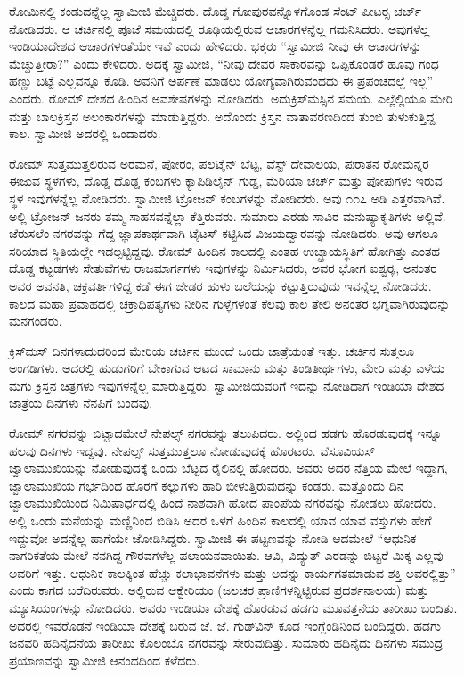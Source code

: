  ರೋಮಿನಲ್ಲಿ ಕಂಡುದನ್ನೆಲ್ಲ ಸ್ವಾಮೀಜಿ ಮೆಚ್ಚಿದರು. ದೊಡ್ಡ ಗೋಪುರವನ್ನೊಳಗೊಂಡ ಸೆಂಟ್ ಪೀಟರ‍್ಸ ಚರ್ಚ್ ನೋಡಿದರು. ಆ ಚರ್ಚಿನಲ್ಲಿ ಪೂಜೆ ಸಮಯದಲ್ಲಿ ರೂಢಿಯಲ್ಲಿರುವ ಆಚಾರಗಳನ್ನೆಲ್ಲ ಗಮನಿಸಿದರು. ಅವುಗಳೆಲ್ಲ ಇಂಡಿಯಾದೇಶದ ಆಚಾರಗಳಂತೆಯೇ ಇವೆ ಎಂದು ಹೇಳಿದರು. ಭಕ್ತರು “ಸ್ವಾಮೀಜಿ ನೀವು ಈ ಆಚಾರಗಳನ್ನು ಮೆಚ್ಚುತ್ತೀರಾ?” ಎಂದು ಕೇಳಿದರು. ಅದಕ್ಕೆ ಸ್ವಾಮೀಜಿ, “ನೀವು ದೇವರ ಸಾಕಾರವನ್ನು ಒಪ್ಪಿಕೊಂಡರೆ ಹೂವು ಗಂಧ ಹಣ್ಣು ಬಟ್ಟೆ ಎಲ್ಲವನ್ನೂ ಕೊಡಿ. ಅವನಿಗೆ ಅರ್ಪಣೆ ಮಾಡಲು ಯೋಗ್ಯವಾಗಿರುವಂಥದು ಈ ಪ್ರಪಂಚದಲ್ಲೆ ಇಲ್ಲ” ಎಂದರು. ರೋಮ್ ದೇಶದ ಹಿಂದಿನ ಅವಶೇಷಗಳನ್ನು ನೋಡಿದರು. ಅದು\break ಕ್ರಿಸ್‍ಮಸ್ಸಿನ ಸಮಯ. ಎಲ್ಲೆಲ್ಲಿಯೂ ಮೇರಿ ಮತ್ತು ಬಾಲಕ್ರಿಸ್ತನ ಅಲಂಕಾರಗಳನ್ನು ಮಾಡುತ್ತಿದ್ದರು. ಅದೊಂದು ಕ್ರಿಸ್ತನ ವಾತಾವರಣದಿಂದ ತುಂಬಿ ತುಳುಕುತ್ತಿದ್ದ ಕಾಲ. ಸ್ವಾಮೀಜಿ ಅದರಲ್ಲಿ ಒಂದಾದರು. 

 ರೋಮ್ ಸುತ್ತಮುತ್ತಲಿರುವ ಅರಮನೆ, ಪೋರಂ, ಪಲಟೈನ್ ಬೆಟ್ಟ, ವೆಸ್ಟ್ ದೇವಾಲಯ, ಪುರಾತನ ರೋಮನ್ನರ ಈಜುವ ಸ್ಥಳಗಳು, ದೊಡ್ಡ ದೊಡ್ಡ ಕಂಬಗಳು ಕ್ಯಾಪಿಡಿಲೈನ್ ಗುಡ್ಡ, ಮೆರಿಯಾ ಚರ್ಚ್ ಮತ್ತು ಪೋಪುಗಳು ಇರುವ ಸ್ಥಳ ಇವುಗಳನ್ನೆಲ್ಲ ನೋಡಿದರು. ಸ್ವಾಮೀಜಿ ಟ್ರೋಜನ್ ಕಂಬಗಳನ್ನು ನೋಡಿದರು. ಅವು ೧೧೭ ಅಡಿ ಎತ್ತರವಾಗಿವೆ. ಅಲ್ಲಿ ಟ್ರೋಜನ್ ಜನರು ತಮ್ಮ ಸಾಹಸವನ್ನೆಲ್ಲಾ ಕೆತ್ತಿರುವರು. ಸುಮಾರು ಎರಡು ಸಾವಿರ ಮನುಷ್ಯಾಕೃತಿಗಳು ಅಲ್ಲಿವೆ. ಜೆರುಸಲೆಂ ನಗರವನ್ನು ಗೆದ್ದ ಜ್ಞಾಪಕಾರ್ಥವಾಗಿ ಟೈಟಸ್ ಕಟ್ಟಿಸಿದ ವಿಜಯದ್ವಾರವನ್ನು ನೋಡಿದರು. ಅವು ಆಗಲೂ ಸರಿಯಾದ ಸ್ಥಿತಿಯಲ್ಲೇ ಇಡಲ್ಪಟ್ಟಿದ್ದವು. ರೋಮ್ ಹಿಂದಿನ ಕಾಲದಲ್ಲಿ ಎಂತಹ ಉಚ್ಛ್ರಾಯಸ್ಥಿತಿಗೆ ಹೋಗಿತ್ತು ಎಂತಹ ದೊಡ್ಡ ಕಟ್ಟಡಗಳು ಸೇತುವೆಗಳು ರಾಜಮಾರ್ಗಗಳು ಇವುಗಳನ್ನು ನಿರ್ಮಿಸಿದರು, ಅವರ ಭೋಗ ಐಶ್ವರ‍್ಯ, ಅನಂತರ ಅವರ ಅವನತಿ, ಚಕ್ರವರ್ತಿಗಳಿದ್ದ ಕಡೆ ಈಗ ಜೇಡರ ಹುಳು ಬಲೆಯನ್ನು ಕಟ್ಟುತ್ತಿರುವುದು ಇವನ್ನೆಲ್ಲ ನೋಡಿದರು. ಕಾಲದ ಮಹಾ ಪ್ರವಾಹದಲ್ಲಿ ಚಕ್ರಾಧಿಪತ್ಯಗಳು ನೀರಿನ ಗುಳ್ಳೆಗಳಂತೆ ಕೆಲವು ಕಾಲ ತೇಲಿ ಅನಂತರ ಭಗ್ನವಾಗಿರುವುದನ್ನು ಮನಗಂಡರು. 

 ಕ್ರಿಸ್‍ಮಸ್ ದಿನಗಳಾದುದರಿಂದ ಮೇರಿಯ ಚರ್ಚಿನ ಮುಂದೆ ಒಂದು ಜಾತ್ರೆಯಂತೆ ಇತ್ತು. ಚರ್ಚಿನ ಸುತ್ತಲೂ ಅಂಗಡಿಗಳು. ಅದರಲ್ಲಿ ಹುಡುಗರಿಗೆ ಬೇಕಾಗುವ ಆಟದ ಸಾಮಾನು ಮತ್ತು ತಿಂಡಿತೀರ್ಥಗಳು, ಮೇರಿ ಮತ್ತು ಎಳೆಯ ಮಗು ಕ್ರಿಸ್ತನ ಚಿತ್ರಗಳು ಇವುಗಳನ್ನೆಲ್ಲ ಮಾರುತ್ತಿದ್ದರು. ಸ್ವಾಮೀಜಿಯವರಿಗೆ ಇದನ್ನು ನೋಡಿದಾಗ ಇಂಡಿಯಾ ದೇಶದ ಜಾತ್ರೆಯ ದಿನಗಳು ನೆನಪಿಗೆ ಬಂದವು. 

 ರೋಮ್ ನಗರವನ್ನು ಬಿಟ್ಟಾದಮೇಲೆ ನೇಪಲ್ಸ್ ನಗರವನ್ನು ತಲುಪಿದರು. ಅಲ್ಲಿಂದ ಹಡಗು ಹೊರಡುವುದಕ್ಕೆ ಇನ್ನೂ ಹಲವು ದಿನಗಳು ಇದ್ದವು. ನೇಪಲ್ಸ್ ಸುತ್ತಮುತ್ತಲೂ ನೋಡುವುದಕ್ಕೆ ಹೊರಟರು. ವೆಸೂವಿಯಸ್ ಜ್ವಾಲಾಮುಖಿಯನ್ನು ನೋಡುವುದಕ್ಕೆ ಒಂದು ಬೆಟ್ಟದ ರೈಲಿನಲ್ಲಿ ಹೋದರು. ಅವರು ಅದರ ನೆತ್ತಿಯ ಮೇಲೆ ಇದ್ದಾಗ, ಜ್ವಾಲಾಮುಖಿಯ ಗರ್ಭದಿಂದ ಹೊರಗೆ ಕಲ್ಲುಗಳು ಹಾರಿ ಬೀಳುತ್ತಿರುವುದನ್ನು ಕಂಡರು. ಮತ್ತೊಂದು ದಿನ ಜ್ವಾಲಾಮುಖಿಯಿಂದ ನಿಮಿಷಾರ್ಧದಲ್ಲಿ ಹಿಂದೆ ನಾಶವಾಗಿ ಹೋದ ಪಾಂಪೆಯ ನಗರವನ್ನು ನೋಡಲು ಹೋದರು. ಅಲ್ಲಿ ಒಂದು ಮನೆಯನ್ನು ಮಣ್ಣಿನಿಂದ ಬಿಡಿಸಿ ಅದರ ಒಳಗೆ ಹಿಂದಿನ ಕಾಲದಲ್ಲಿ ಯಾವ ಯಾವ ವಸ್ತುಗಳು ಹೇಗೆ ಇದ್ದುವೋ ಅದನ್ನೆಲ್ಲ ಹಾಗೆಯೇ ಜೋಡಿಸಿದ್ದರು. ಸ್ವಾಮೀಜಿ ಈ ಪಟ್ಟಣವನ್ನು ನೋಡಿ ಆದಮೇಲೆ “ಆಧುನಿಕ ನಾಗರಿಕತೆಯ ಮೇಲೆ ನನಗಿದ್ದ ಗೌರವಗಳೆಲ್ಲ ಪಲಾಯನವಾಯಿತು. ಆವಿ, ವಿದ್ಯುತ್ ಎರಡನ್ನು ಬಿಟ್ಟರೆ ಮಿಕ್ಕ ಎಲ್ಲವು ಅವರಿಗೆ ಇತ್ತು. ಆಧುನಿಕ ಕಾಲಕ್ಕಿಂತ ಹೆಚ್ಚು ಕಲಾಭಾವನೆಗಳು ಮತ್ತು ಅದನ್ನು ಕಾರ್ಯಗತಮಾಡುವ ಶಕ್ತಿ ಅವರಲ್ಲಿತ್ತು” ಎಂದು ಕಾಗದ ಬರೆದಿರುವರು. ಅಲ್ಲಿರುವ ಆಕ್ವೇರಿಯಂ (ಜಲಚರ ಪ್ರಾಣಿಗಳನ್ನಿಟ್ಟಿರುವ ಪ್ರದರ್ಶನಾಲಯ) ಮತ್ತು ಮ್ಯೂಸಿಯಂಗಳನ್ನು ನೋಡಿದರು. ಅವರು ಇಂಡಿಯಾ ದೇಶಕ್ಕೆ ಹೊರಡುವ ಹಡಗು ಮೂವತ್ತನೆಯ ತಾರೀಖು ಬಂದಿತು. ಅದರಲ್ಲಿ ಇವರೊಡನೆ ಇಂಡಿಯಾ ದೇಶಕ್ಕೆ ಬರುವ ಜೆ. ಜೆ. ಗುಡ್‍ವಿನ್ ಕೂಡ ಇಂಗ್ಲೆಂಡಿನಿಂದ ಬಂದಿದ್ದರು. ಹಡಗು ಜನವರಿ ಹದಿನೈದನೆಯ ತಾರೀಖು ಕೊಲಂಬೊ ನಗರವನ್ನು ಸೇರುವುದಿತ್ತು. ಸುಮಾರು ಹದಿನೈದು ದಿನಗಳು ಸಮುದ್ರ ಪ್ರಯಾಣವನ್ನು ಸ್ವಾಮೀಜಿ ಆನಂದದಿಂದ ಕಳೆದರು. 

